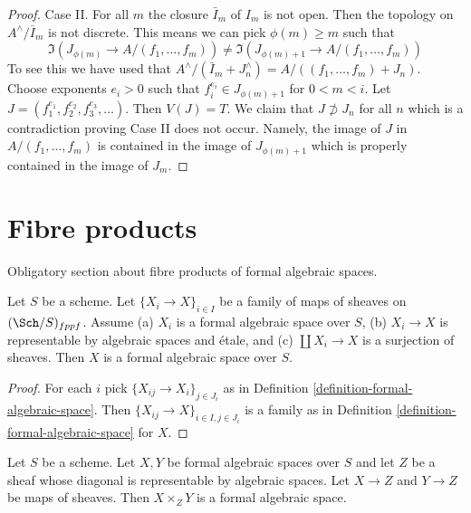 \begin{proof}
\medskip\noindent
Case II. For all $m$ the closure $\bar I_m$ of $I_m$ is not open.
Then the topology on $A^\wedge/\bar I_m$ is not discrete. This means
we can pick $\phi(m) \geq m$ such that
$$
\Im(J_{\phi(m)} \to A/(f_1, \ldots, f_m)) \not =
\Im(J_{\phi(m) + 1} \to A/(f_1, \ldots, f_m))
$$
To see this we have used that
$A^\wedge/(\bar I_m + J_n^\wedge) = A/((f_1, \ldots, f_m) + J_n)$.
Choose exponents $e_i > 0$ such that $f_i^{e_i} \in J_{\phi(m) + 1}$
for $0 < m < i$. Let $J = (f_1^{e_1}, f_2^{e_2}, f_3^{e_3}, \ldots)$.
Then $V(J) = T$. We claim that $J \not \supset J_n$ for all $n$
which is a contradiction proving Case II does not occur.
Namely, the image of $J$ in $A/(f_1, \ldots, f_m)$ is contained
in the image of $J_{\phi(m) + 1}$ which is properly contained in the
image of $J_m$.
\end{proof}
















\section{Fibre products}
\label{section-fibre-products}

\noindent
Obligatory section about fibre products of formal algebraic spaces.

\begin{lemma}
\label{lemma-etale-covering-by-formal-algebraic-spaces}
Let $S$ be a scheme. Let $\{X_i \to X\}_{i \in I}$ be a family of maps
of sheaves on $(\Sch/S)_{fppf}$. Assume (a) $X_i$ is a
formal algebraic space over $S$, (b) $X_i \to X$ is representable
by algebraic spaces and \'etale, and (c) $\coprod X_i \to X$
is a surjection of sheaves. Then $X$ is a formal algebraic space
over $S$.
\end{lemma}

\begin{proof}
For each $i$ pick $\{X_{ij} \to X_i\}_{j \in J_i}$ as in
Definition \ref{definition-formal-algebraic-space}.
Then $\{X_{ij} \to X\}_{i \in I, j \in J_i}$ is a family
as in Definition \ref{definition-formal-algebraic-space}
for $X$.
\end{proof}

\begin{lemma}
\label{lemma-fibre-products-general}
Let $S$ be a scheme. Let $X, Y$ be formal algebraic spaces over $S$
and let $Z$ be a sheaf whose diagonal is representable by
algebraic spaces. Let $X \to Z$ and $Y \to Z$ be maps of sheaves.
Then $X \times_Z Y$ is a formal algebraic space.
\end{lemma}

